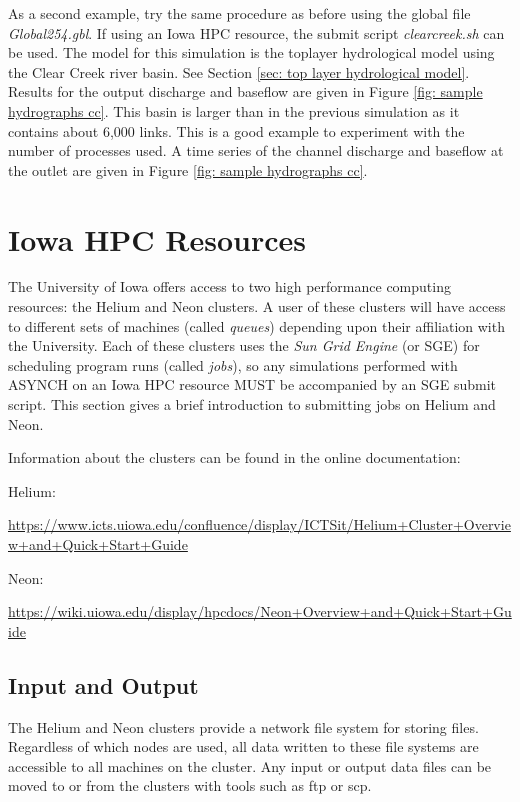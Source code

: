 \documentclass[12pt]{article}
\newenvironment{codeindent}
{\begin{list}{}
        {\setlength{\leftmargin}{.1in}}
        \item[]
}
{\end{list}}
\begin{document}
As a second example, try the same procedure as before using the global file \emph{Global254.gbl}. If using an Iowa HPC resource, the submit script \emph{clearcreek.sh} can be used. The model for this simulation is the toplayer hydrological model using the Clear Creek river basin. See Section \ref{sec: top layer hydrological model}. Results for the output discharge and baseflow are given in Figure \ref{fig: sample hydrographs cc}. This basin is larger than in the previous simulation as it contains about 6,000 links. This is a good example to experiment with the number of processes used. A time series of the channel discharge and baseflow at the outlet are given in Figure \ref{fig: sample hydrographs cc}.


\section{Iowa HPC Resources} \label{sec: iowa hpc resources}

The University of Iowa offers access to two high performance computing resources: the Helium and Neon clusters. A user of these clusters will have access to different sets of machines (called \emph{queues}) depending upon their affiliation with the University. Each of these clusters uses the \emph{Sun Grid Engine} (or SGE) for scheduling program runs (called \emph{jobs}), so any simulations performed with ASYNCH on an Iowa HPC resource MUST be accompanied by an SGE submit script. This section gives a brief introduction to submitting jobs on Helium and Neon.

Information about the clusters can be found in the online documentation:
\begin{codeindent}
\raggedright
Helium:

\url{https://www.icts.uiowa.edu/confluence/display/ICTSit/Helium+Cluster+Overview+and+Quick+Start+Guide}

Neon:

\url{https://wiki.uiowa.edu/display/hpcdocs/Neon+Overview+and+Quick+Start+Guide}
\end{codeindent}


\subsection{Input and Output} \label{sec: input and output}

The Helium and Neon clusters provide a network file system for storing files. Regardless of which nodes are used, all data written to these file systems are accessible to all machines on the cluster. Any input or output data files can be moved to or from the clusters with tools such as ftp or scp.
\end{document}
